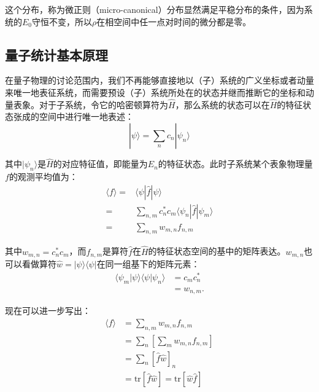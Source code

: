 \documentclass[UTF8]{ctexart}
\begin{document}
\begin{spacing}{2.0}
这个分布，称为微正则（micro-canonical）分布显然满足平稳分布的条件，因为系统的$E_{0}$守恒不变，所以$\rho$在相空间中任一点对时间的微分都是零。

\subsection{量子统计基本原理}
在量子物理的讨论范围内，我们不再能够直接地以（子）系统的广义坐标或者动量来唯一地表征系统，而需要预设（子）系统所处在的状态并继而推断它的坐标和动量表象。对于子系统，令它的哈密顿算符为$\hat{H}$，那么系统的状态可以在$\hat{H}$的特征状态张成的空间中进行唯一地表述：
\begin{equation}
|\psi\rangle=\sum_{n}c_{n}|\psi_{n}\rangle
\end{equation}

其中$|\psi_{n}\rangle$是$\hat{H}$的对应特征值，即能量为$E_{n}$的特征状态。此时子系统某个表象物理量$f$的观测平均值为：
\begin{equation}
\begin{aligned}
\langle f\rangle =& \langle \psi | \hat{f}|\psi\rangle \\
=&\sum_{n,m}c^{*}_{n}c_{m}\langle \psi_{n} | \hat{f}|\psi_{m}\rangle \\
=&\sum_{n,m}w_{m,n}f_{n,m}
\end{aligned}
\end{equation}

其中$w_{m,n}=c^{*}_{n}c_{m}$，而$f_{n,m}$是算符$\hat{f}$在$\hat{H}$的特征状态空间的基中的矩阵表达。$w_{m,n}$也可以看做算符$\hat{w}=|\psi\rangle\langle\psi|$在同一组基下的矩阵元素：
\begin{equation}
\begin{aligned}
\langle \psi_{m}|\psi\rangle\langle\psi|\psi_{n}\rangle &= c_{m}c^{*}_{n}\\
&= w_{n,m}.
\end{aligned}
\end{equation}

现在可以进一步写出：
\begin{equation}
\begin{aligned}
\langle f \rangle &= \sum_{n,m}w_{m,n}f_{n,m} \\
&= \sum_{n}\left[\sum_{m}w_{m,n}f_{n,m} \right] \\
&= \sum_{n}\left[\hat{f}\hat{w} \right]_{n} \\
&= \text{tr}\left[\hat{f}\hat{w} \right]=\text{tr}\left[\hat{w}\hat{f} \right]
\end{aligned}
\end{equation}


\end{spacing}
\end{document}
